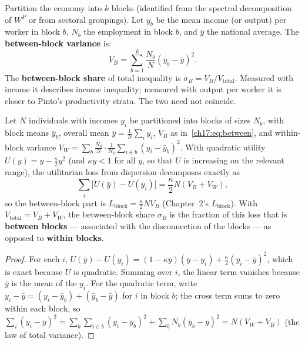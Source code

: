 \documentclass[../structural_economics_book.tex]{subfiles}
\begin{document}
\begin{definition}\label{ch17:def:between}
Partition the economy into $k$ blocks (identified from the spectral decomposition of $W^P$ or from sectoral groupings). Let $\bar{y}_b$ be the mean income (or output) per worker in block $b$, $N_b$ the employment in block $b$, and $\bar{y}$ the national average. The \textbf{between-block variance} is:
\begin{equation}\label{ch17:eq:between}
V_B = \sum_{b=1}^k \frac{N_b}{N}(\bar{y}_b - \bar{y})^2.
\end{equation}
The \textbf{between-block share} of total inequality is $\sigma_B = V_B / V_{\text{total}}$. Measured with income it describes income inequality; measured with output per worker it is closer to Pinto's productivity strata. The two need not coincide.
\end{definition}

\begin{proposition}\label{ch17:prop:between}
Let $N$ individuals with incomes $y_i$ be partitioned into blocks of sizes $N_b$, with block means $\bar y_b$, overall mean $\bar y = \frac1N\sum_i y_i$, $V_B$ as in~\eqref{ch17:eq:between}, and within-block variance $V_W = \sum_b \frac{N_b}{N}\cdot\frac{1}{N_b}\sum_{i\in b}(y_i - \bar y_b)^2$. With quadratic utility $U(y) = y - \frac{\kappa}{2}y^2$ (and $\kappa y < 1$ for all $y$, so that $U$ is increasing on the relevant range), the utilitarian loss from dispersion decomposes exactly as
\[
\textstyle\sum_i\big[U(\bar y) - U(y_i)\big] = \frac{\kappa}{2}N(V_B + V_W),
\]
so the between-block part is $L_{\text{block}} = \frac{\kappa}{2}NV_B$ (Chapter~2's $L_{\text{block}}$). With $V_{\text{total}} = V_B + V_W$, the between-block share $\sigma_B$ is the fraction of this loss that is \textbf{between blocks} --- associated with the disconnection of the blocks --- as opposed to \textbf{within blocks}.
\end{proposition}

\begin{proof}
For each $i$, $U(\bar y) - U(y_i) = (1 - \kappa\bar y)(\bar y - y_i) + \frac{\kappa}{2}(y_i - \bar y)^2$, which is exact because $U$ is quadratic. Summing over $i$, the linear term vanishes because $\bar y$ is the mean of the $y_i$. For the quadratic term, write $y_i - \bar y = (y_i - \bar y_b) + (\bar y_b - \bar y)$ for $i$ in block $b$; the cross term sums to zero within each block, so $\sum_i (y_i - \bar y)^2 = \sum_b\sum_{i\in b}(y_i - \bar y_b)^2 + \sum_b N_b(\bar y_b - \bar y)^2 = N(V_W + V_B)$ (the law of total variance).
\end{proof}
\end{document}

